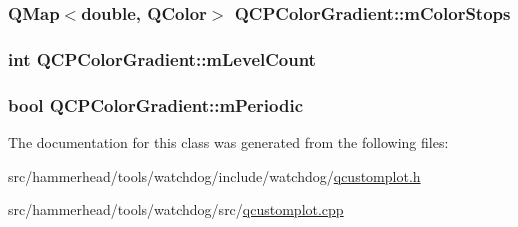 \subsubsection[{\texorpdfstring{m\+Color\+Stops}{mColorStops}}]{\setlength{\rightskip}{0pt plus 5cm}Q\+Map$<$double, Q\+Color$>$ Q\+C\+P\+Color\+Gradient\+::m\+Color\+Stops\hspace{0.3cm}{\ttfamily [protected]}}\hypertarget{classQCPColorGradient_a9e11a2b0974ef289d12c324822bc3a3e}{}\label{classQCPColorGradient_a9e11a2b0974ef289d12c324822bc3a3e}
\subsubsection[{\texorpdfstring{m\+Level\+Count}{mLevelCount}}]{\setlength{\rightskip}{0pt plus 5cm}int Q\+C\+P\+Color\+Gradient\+::m\+Level\+Count\hspace{0.3cm}{\ttfamily [protected]}}\hypertarget{classQCPColorGradient_a98fb68e359904b2c991fcae3e38a211a}{}\label{classQCPColorGradient_a98fb68e359904b2c991fcae3e38a211a}
\subsubsection[{\texorpdfstring{m\+Periodic}{mPeriodic}}]{\setlength{\rightskip}{0pt plus 5cm}bool Q\+C\+P\+Color\+Gradient\+::m\+Periodic\hspace{0.3cm}{\ttfamily [protected]}}\hypertarget{classQCPColorGradient_a4b07deeb20ca1ee2d5ea7e01bf0420af}{}\label{classQCPColorGradient_a4b07deeb20ca1ee2d5ea7e01bf0420af}


The documentation for this class was generated from the following files\+:\begin{DoxyCompactItemize}
\item 
src/hammerhead/tools/watchdog/include/watchdog/\hyperlink{qcustomplot_8h}{qcustomplot.\+h}\item 
src/hammerhead/tools/watchdog/src/\hyperlink{qcustomplot_8cpp}{qcustomplot.\+cpp}\end{DoxyCompactItemize}
